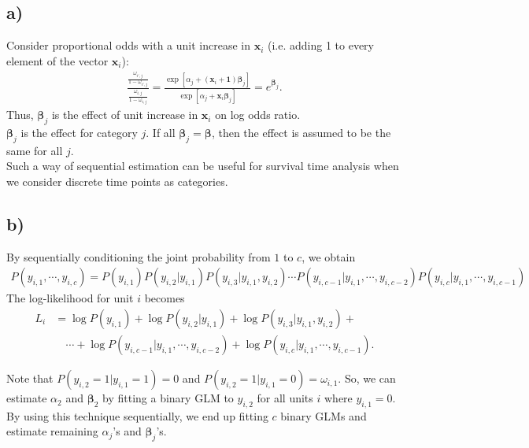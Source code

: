 \documentclass[a4paper]{article}
\begin{document}
\subsection{a)}
Consider proportional odds with a unit increase in $\bm{x}_{i}$ (i.e. adding 1 to every element of the vector $\bm{x}_{i}$):
\begin{align*}
\frac{\frac{\omega_{i',j}}{1-\omega_{i',j}}}{\frac{\omega_{i,j}}{1-\omega_{i,j}}} = \frac{\exp\left[\alpha_{j}+(\bm{x}_{i}+\bm{1})\bm{\beta}_{j}\right]}{\exp\left[\alpha_{j}+\bm{x}_{i}\bm{\beta}_{j}\right]} = e^{\bm{\beta}_{j}}.
\end{align*}
Thus, $\bm{\beta}_{j}$ is the effect of unit increase in $\bm{x}_{i}$ on log odds ratio.\\
$\bm{\beta}_{j}$ is the effect for category $j$. If all $\bm{\beta}_{j} = \bm{\beta}$, then the effect is assumed to be the same for all $j$.\\

Such a way of sequential estimation can be useful for survival time analysis when we consider discrete time points as categories.

\vspace{\baselineskip}
\subsection{b)}
By sequentially conditioning the joint probability from $1$ to $c$, we obtain
\begin{align*}
P(y_{i,1}, \cdots, y_{i,c}) = P(y_{i,1})P(y_{i,2}|y_{i,1})P(y_{i,3}|y_{i,1}, y_{i,2}) \cdots P(y_{i,c-1}|y_{i,1}, \cdots, y_{i,c-2}) P(y_{i,c}|y_{i,1}, \cdots, y_{i,c-1})
\end{align*}
The log-likelihood for unit $i$ becomes
\begin{align*}
L_{i} &= \log P(y_{i,1}) + \log P(y_{i,2}|y_{i,1}) + \log P(y_{i,3}|y_{i,1}, y_{i,2}) +\\
&\quad \cdots + \log P(y_{i,c-1}|y_{i,1}, \cdots, y_{i,c-2}) + \log P(y_{i,c}|y_{i,1}, \cdots, y_{i,c-1}).
\end{align*}

Note that $P(y_{i,2} = 1|y_{i,1} = 1) = 0$ and $P(y_{i,2} = 1|y_{i,1} = 0) = \omega_{i,1}$. So, we can estimate $\alpha_{2}$ and $\bm{\beta}_{2}$ by fitting a binary GLM to $y_{i,2}$ for all units $i$ where $y_{i,1} = 0$. By using this technique sequentially, we end up fitting $c$ binary GLMs and estimate remaining $\alpha_{j}$'s and $\bm{\beta}_{j}$'s.
\end{document}
